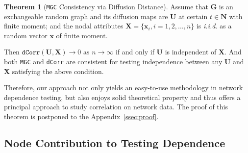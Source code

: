 \documentclass[11pt]{article}
\theoremstyle{definition}
\newtheorem{theorem}{Theorem}[section]
\begin{document}
\begin{theorem}[\texttt{MGC} Consistency via Diffusion Distance]
Assume that $\mathbf{G}$ is an exchangeable random graph and its diffusion maps are $\mathbf{U}$ at certain $t \in \mathbf{N}$ with finite moment; and the nodal attributes $\mathbf{X}=\{ \mathbf{x}_{i}, i = 1,2, \ldots, n \}$ is \textit{i.i.d.} as a random vector $\mathbf{x}$ of finite moment. 

Then $\texttt{dCorr}(\mathbf{U}, \mathbf{X}) \longrightarrow 0 \mbox{ as } n \rightarrow \infty$ if and only if $\mathbf{U}$ is independent of $\mathbf{X}$. And both \texttt{MGC} and \texttt{dCorr} are consistent for testing independence between any $\mathbf{U}$ and $\mathbf{X}$ satisfying the above condition.
	\label{theoremMain}
\end{theorem}
	\vspace*{-0.7cm}
Therefore, our approach not only yields an easy-to-use methodology in network dependence testing, but also enjoys solid theoretical property and thus offers a principal approach to study correlation on network data. The proof of this theorem is postponed to the Appendix~\ref{ssec:proof}.


\subsection{Node Contribution to Testing Dependence}
\end{document}
